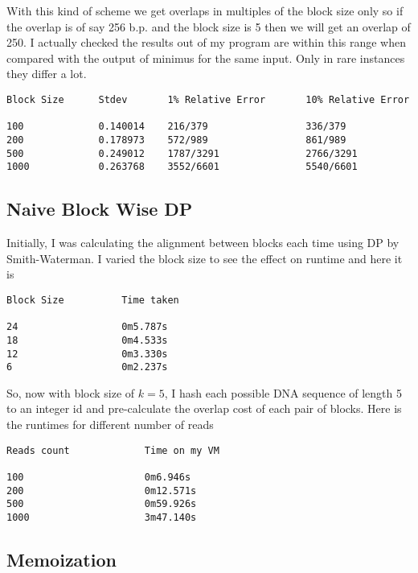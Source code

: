 \documentclass{article}
\begin{document}
            With this kind of scheme we get overlaps in multiples of the block size only so if the overlap is of say 256 b.p. and the block size is 5 then we will get an overlap of 250. I actually checked the results out of my program are within this range when compared with the output of minimus for the same input. Only in rare instances they differ a lot.
            
\begin{verbatim}
Block Size      Stdev       1% Relative Error       10% Relative Error

100             0.140014    216/379                 336/379
200             0.178973    572/989                 861/989
500             0.249012    1787/3291               2766/3291
1000            0.263768    3552/6601               5540/6601

\end{verbatim}

        \subsection{Naive Block Wise DP}
        
            Initially, I was calculating the alignment between blocks each time using DP by Smith-Waterman. I varied the block size to see the effect on runtime and here it is

\begin{verbatim}
Block Size          Time taken

24                  0m5.787s
18                  0m4.533s
12                  0m3.330s
6                   0m2.237s
\end{verbatim}

            So, now with block size of $k=5$, I hash each possible DNA sequence of length 5 to an integer id and pre-calculate the overlap cost of each pair of blocks. Here is the runtimes for different number of reads

\begin{verbatim}
Reads count             Time on my VM

100                     0m6.946s
200                     0m12.571s
500                     0m59.926s
1000                    3m47.140s
\end{verbatim}

        \subsection{Memoization}
        
\end{document}
